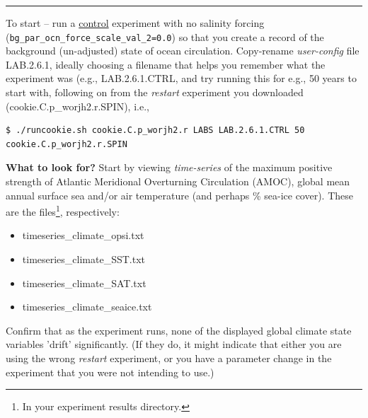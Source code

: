 \vspace{1mm}\noindent\rule{4cm}{0.5pt}\vspace{2mm}

\noindent To start -- run a \uline{control} experiment with no salinity forcing (\texttt{\small bg\_par\_ocn\_force\_scale\_val\_2=0.0}) so that you create a record of the background (un-adjusted) state of ocean circulation. Copy-rename \textit{user-config} file \textsf{\footnotesize LAB.2.6.1}, ideally choosing a filename that helps you remember what the experiment was (e.g., \textsf{\footnotesize LAB.2.6.1.CTRL}, and try running this for e.g., 50 years to start with, following on from the \textit{restart} experiment you downloaded (\textsf{\footnotesize cookie.C.p\_worjh2.r.SPIN}), i.e.,

\vspace{-2mm}\small\begin{verbatim}
$ ./runcookie.sh cookie.C.p_worjh2.r LABS LAB.2.6.1.CTRL 50 cookie.C.p_worjh2.r.SPIN
\end{verbatim}\normalsize\vspace{-2mm}

\noindent \textbf{What to look for?} Start by viewing \textit{time-series} of the maximum positive strength of Atlantic Meridional Overturning Circulation (AMOC), global mean annual surface sea and/or air temperature (and perhaps \% sea-ice cover). These are the files\footnote{In your experiment \textsf{\footnotesize results} directory.}, respectively:

\vspace{1mm}
\begin{itemize}[noitemsep]
\setlength{\itemindent}{.0in}
\item [] \textsf{\footnotesize timeseries\_climate\_opsi.txt}
\item [] \textsf{\footnotesize timeseries\_climate\_SST.txt}
\item [] \textsf{\footnotesize timeseries\_climate\_SAT.txt}
\item [] \textsf{\footnotesize timeseries\_climate\_seaice.txt}
\end{itemize}

\vspace{1mm}
Confirm that as the experiment runs, none of the displayed global climate state variables 'drift' significantly. (If they do, it might indicate that either you are using the wrong \textit{restart} experiment, or you have a parameter change in the experiment that you were not intending to use.)

